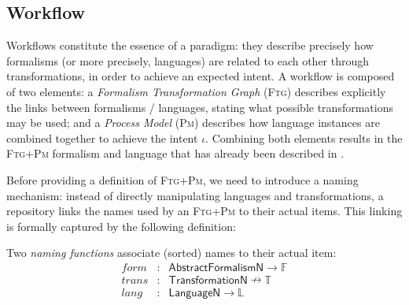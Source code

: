 \subsection{Workflow}
\label{sec:Workflow}

Workflows constitute the essence of a paradigm: they describe precisely how 
formalisms (or more precisely, languages) are related to each other through 
transformations, in order to achieve an expected intent. 
A workflow is composed of two elements: a \emph{Formalism Transformation Graph} 
(\textsc{Ftg}) describes explicitly the links between formalisms / languages, 
stating what possible transformations may be used; and a \emph{Process Model} 
(\textsc{Pm}) describes how language instances are 
combined together to achieve the intent $\iota$. Combining both elements 
results in the \textsc{Ftg+Pm} formalism and language that has already been 
described in 
\cite{Mustafiz-etAl:2012,Lucio-Mustafiz-etAl:2013,TR:Lucio-Mustafiz-etAl:2012}.

Before providing a definition of \textsc{Ftg+Pm}, we need to introduce a naming 
mechanism: instead of directly manipulating languages and transformations, a 
repository links the names used by an \textsc{Ftg+Pm} to their actual items. 
This linking is formally captured by the following definition:



\begin{Definition}
   Two \emph{naming functions} associate (sorted) names to their actual item:
   \begin{displaymath}
      \begin{array}{rcl}
         form  &\colon& \mathsf{AbstractFormalismN} \to \mathbb{F}\\
         trans &\colon& \mathsf{TransformationN} \nrightarrow \mathbb{T}\\
         lang  &\colon& \mathsf{LanguageN} \to \mathbb{L}
      \end{array}
   \end{displaymath}
\end{Definition}

